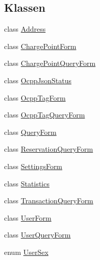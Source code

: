 \subsection*{Klassen}
\begin{DoxyCompactItemize}
\item 
class \hyperlink{classde_1_1rwth_1_1idsg_1_1steve_1_1web_1_1dto_1_1_address}{Address}
\item 
class \hyperlink{classde_1_1rwth_1_1idsg_1_1steve_1_1web_1_1dto_1_1_charge_point_form}{Charge\-Point\-Form}
\item 
class \hyperlink{classde_1_1rwth_1_1idsg_1_1steve_1_1web_1_1dto_1_1_charge_point_query_form}{Charge\-Point\-Query\-Form}
\item 
class \hyperlink{classde_1_1rwth_1_1idsg_1_1steve_1_1web_1_1dto_1_1_ocpp_json_status}{Ocpp\-Json\-Status}
\item 
class \hyperlink{classde_1_1rwth_1_1idsg_1_1steve_1_1web_1_1dto_1_1_ocpp_tag_form}{Ocpp\-Tag\-Form}
\item 
class \hyperlink{classde_1_1rwth_1_1idsg_1_1steve_1_1web_1_1dto_1_1_ocpp_tag_query_form}{Ocpp\-Tag\-Query\-Form}
\item 
class \hyperlink{classde_1_1rwth_1_1idsg_1_1steve_1_1web_1_1dto_1_1_query_form}{Query\-Form}
\item 
class \hyperlink{classde_1_1rwth_1_1idsg_1_1steve_1_1web_1_1dto_1_1_reservation_query_form}{Reservation\-Query\-Form}
\item 
class \hyperlink{classde_1_1rwth_1_1idsg_1_1steve_1_1web_1_1dto_1_1_settings_form}{Settings\-Form}
\item 
class \hyperlink{classde_1_1rwth_1_1idsg_1_1steve_1_1web_1_1dto_1_1_statistics}{Statistics}
\item 
class \hyperlink{classde_1_1rwth_1_1idsg_1_1steve_1_1web_1_1dto_1_1_transaction_query_form}{Transaction\-Query\-Form}
\item 
class \hyperlink{classde_1_1rwth_1_1idsg_1_1steve_1_1web_1_1dto_1_1_user_form}{User\-Form}
\item 
class \hyperlink{classde_1_1rwth_1_1idsg_1_1steve_1_1web_1_1dto_1_1_user_query_form}{User\-Query\-Form}
\item 
enum \hyperlink{enumde_1_1rwth_1_1idsg_1_1steve_1_1web_1_1dto_1_1_user_sex}{User\-Sex}
\end{DoxyCompactItemize}
